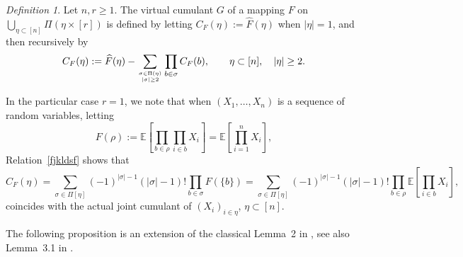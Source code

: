 \documentclass[bj,authoryear,noshowframe]{imsart}
\theoremstyle{plain}
\theoremstyle{remark}
\newtheorem{definition}[theorem]{Definition}
\newcommand{\E}{\mathbb{E}}
\begin{document}
 \vspace{-0.2cm}
 
 \begin{definition}
   Let $n,r\geq 1$.
   The virtual cumulant $G$ of 
  a mapping $F$ on $\bigcup_{\eta \subset [n]} \Pi ( \eta \times [r])$ 
  is defined by letting  
  $C_F ( \eta ):=\widehat{F}( \eta )$ when $| \eta |=1$, and
  then recursively by 
 \begin{equation}
   \label{fjkldsf}
   C_F ( \eta ):=\widehat{F}( \eta )-\sum_{
     { \sigma \in \Pi (\eta )
     \atop 
     |\sigma|\geq 2
     }
   }
   \prod_{b \in \sigma } C_F ( b ), \qquad
   \eta \subset [n], \quad |\eta |\geq 2. 
 \end{equation}
 \end{definition} 
 
 \vspace{-0.4cm}
 
 \noindent
  In the particular case $r=1$, we note that when
  $(X_1,\ldots , X_n)$ is a sequence of random variables, letting 
 $$
  F(\rho) := \E\left[ \prod_{b \in \rho} \prod_{i \in b} X_i \right]
  = \E\left[ \prod_{i=1}^n X_i \right], 
 $$ 
  Relation~\eqref{fjkldsf} shows that 
 $$ 
  C_F ( \eta )=
  \sum_{
    \sigma \in \Pi [ \eta ]
  }
  (-1)^{|\sigma |-1} (|\sigma |-1)! \prod_{b\in \sigma} F ( \{ b \} )
  =
  \sum_{
    \sigma \in \Pi [ \eta ]
  }
  (-1)^{|\sigma |-1} (|\sigma |-1)! 
  \prod_{b \in \rho} \E\left[ \prod_{i \in b} X_i \right],
 $$
  coincides with the actual joint cumulant of
  $(X_i)_{i\in \eta}$, $\eta \subset [n]$.
 
  
 The following proposition is an extension of
 the classical Lemma~2 in \cite[p.~34]{MalyshevMinlos91},
 see also Lemma~3.1 in \cite{khorunzhiy}.
 
  \vspace{-0.2cm}
 
\end{document}
